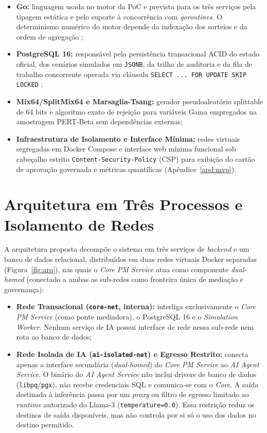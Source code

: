 \documentclass[12pt,openany,oneside,a4paper,english,brazilian,sumario=tradicional]{abntex2}
\begin{document}
\begin{itemize}
  \item \textbf{Go:} linguagem usada no motor da PoC e prevista para os três serviços pela tipagem estática e pelo suporte à concorrência com \textit{goroutines}. O determinismo numérico do motor depende da indexação dos sorteios e da ordem de agregação \cite{donovan2015};
  \item \textbf{PostgreSQL 16:} responsável pela persistência transacional ACID do estado oficial, dos cenários simulados em \texttt{JSONB}, da trilha de auditoria e da fila de trabalho concorrente operada via cláusula \texttt{SELECT ... FOR UPDATE SKIP LOCKED} \cite{postgresql2024};
  \item \textbf{Mix64/SplitMix64 e Marsaglia-Tsang:} gerador pseudoaleatório splittable de 64 bits \cite{steele2014,lecuyer2017} e algoritmo exato de rejeição para variáveis Gama \cite{marsaglia2000} empregados na amostragem PERT-Beta sem dependências externas;
  \item \textbf{Infraestrutura de Isolamento e Interface Mínima:} redes virtuais segregadas em Docker Compose \cite{merkel2014} e interface web mínima funcional sob cabeçalho estrito \texttt{Content-Security-Policy} (CSP) para exibição do cartão de aprovação governada e métricas quantílicas (Apêndice~\ref{apd:mvp}).
\end{itemize}

\section{Arquitetura em Três Processos e Isolamento de Redes}\label{sec:arq_redes}

A arquitetura proposta decompõe o sistema em três serviços de \textit{backend} e um banco de dados relacional, distribuídos em duas redes virtuais Docker separadas (Figura~\ref{fig:arq}), nas quais o \textit{Core PM Service} atua como componente \textit{dual-homed} (conectado a ambas as sub-redes como fronteira única de mediação e governança):

\begin{itemize}
  \item \textbf{Rede Transacional (\texttt{core-net}, interna):} interliga exclusivamente o \textit{Core PM Service} (como ponte mediadora), o PostgreSQL 16 e o \textit{Simulation Worker}. Nenhum serviço de IA possui interface de rede nessa sub-rede nem rota ao banco de dados;
  \item \textbf{Rede Isolada de IA (\texttt{ai-isolated-net}) e Egresso Restrito:} conecta apenas a interface secundária (\textit{dual-homed}) do \textit{Core PM Service} ao \textit{AI Agent Service}. O binário do \textit{AI Agent Service} não inclui drivers de banco de dados (\texttt{libpq}/\texttt{pgx}), não recebe credenciais SQL e comunica-se com o \textit{Core}. A saída destinada à inferência passa por um \textit{proxy} ou filtro de egresso limitado ao \textit{runtime} autorizado do Llama-3 (\texttt{temperature=0.0}). Essa restrição reduz os destinos de saída disponíveis, mas não controla por si só o uso dos dados no destino permitido.
\end{itemize}
\end{document}
